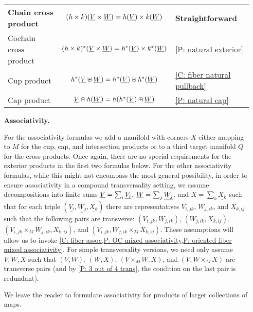 \begin{center}
	\begin{tabular}{|l|c|l|}
		\hline
		Chain cross product&$(h \times k)(\underline{V} \times \underline{W}) = h(\underline{V}) \times k(\underline{W})$ &Straightforward\\
		\hline
		Cochain cross product&$(h \times k)^*(\underline{V} \times \underline{W}) = h^*(\underline{V}) \times k^*(\underline{W})$ &\cref{P: natural exterior}\\
		\hline
		Cup product &$h^*(\underline{V}\uplus \underline{W}) = h^*(\underline{V}) \uplus h^*(\underline{W})$&\cref{C: fiber natural pullback}\\
		\hline
		Cap product &$\underline{V} \nplus h(\underline{W}) = h(h^*(\underline{V})\nplus \underline{W})$&\cref{P: natural cap}\\
		\hline
	\end{tabular}
\end{center}

\medskip\noindent\textbf{Associativity.}

For the associativity formulas we add a manifold with corners $X$ either mapping to $M$ for the cup, cap, and intersection products or to a third target manifold $Q$ for the cross products.
Once again, there are no special requirements for the exterior products in the first two formulas below.
For the other associativity formulas, while this might not encompass the most general possibility, in order to ensure associativity in a compound transversality setting, we assume decompositions into finite sums $\underline{V} = \sum_i \underline{V_i}$, $\underline{W} = \sum_j \underline{W_j}$, and $\underline{X} = \sum_k \underline{X_k}$ such that for each triple $(\underline{V_i},\underline{W_j}, \underline{X_k})$ there are representatives $V_{i,jk}$, $W_{j,ik}$, and $X_{k,ij}$ such that the following pairs are transverse: $(V_{i,jk}, W_{j,ik})$, $(W_{j,ik},X_{k,ij})$, $(V_{i,jk} \times_M W_{j,ik},X_{k,ij})$, and $(V_{i,jk}, W_{j,ik} \times_M X_{k,ij})$.
These assumptions will allow us to invoke \cref{C: fiber assoc,P: OC mixed associativity,P: oriented fiber mixed associativity}.
For simple transversality versions, we need only assume $V, W, X$ such that $(V, W)$, $(W,X)$, $(V \times_M W,X)$, and $(V, W \times_M X)$ are transverse pairs (and by \cref{P: 3 out of 4 trans}, the condition on the last pair is redundant).

We leave the reader to formulate associativity for products of larger collections of maps.

